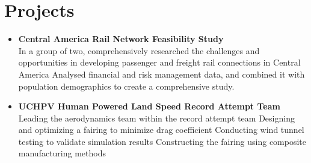 \documentclass[a4paper,10pt]{article}
\begin{document}
\section*{Projects}
\begin{itemize}
    \item \textbf{Central America Rail Network Feasibility Study} \\
    In a group of two, comprehensively researched the challenges and opportunities in developing passenger and freight rail connections in Central America
    Analysed financial and risk management data, and combined it with population demographics to create a comprehensive study. 
    \item \textbf{UCHPV Human Powered Land Speed Record Attempt Team} \\
    Leading the aerodynamics team within the record attempt team
    Designing and optimizing a fairing to minimize drag coefficient
    Conducting wind tunnel testing to validate simulation results
    Constructing the fairing using composite manufacturing methods
\end{itemize}
\end{document}
